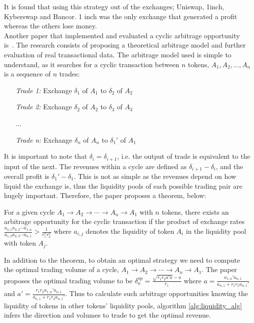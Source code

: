 \noindent It is found that using this strategy out of the exchanges; Uniswap, 1inch, Kyberswap and Bancor. 1 inch was the only exchange that generated a profit whereas the others lose money.
\\[5mm]
Another paper that implemented and evaluated a cyclic arbitrage opportunity is~\cite{wang_cyclic_2022}. The research consists of proposing a theoretical arbitrage model and further evaluation of real transactional data. The arbitrage model used is simple to understand, as it searches for a cyclic transaction between $n$ tokens, $A_1, A_2, ..., A_n$ is a sequence of $n$ trades:
\begin{center}
    \begin{minipage}[c]{0.4\linewidth}
        \begin{itemize}
            \item[\textit{Trade 1:}] Exchange $\delta_1$ of $A_1$ to $\delta_2$ of $A_2$
            \item[\textit{Trade 2:}] Exchange $\delta_2$ of $A_2$ to $\delta_3$ of $A_3$
            \item[] $\dotsc$
            \item[\textit{Trade n:}] Exchange $\delta_n$ of $A_n$ to $\delta_1'$ of $A_1$
        \end{itemize}
    \end{minipage}
\end{center}

\noindent It is important to note that $\delta_i = \delta_{i+1}$, i.e. the output of trade is equivalent to the input of the next. The revenues within a cycle are defined as $\delta_{i+1} - \delta_i$, and the overall profit is $\delta_{1}' - \delta_1$. This is not as simple as the revenues depend on how liquid the exchange is, thus the liquidity pools of each possible trading pair are hugely important. Therefore, the paper proposes a theorem, below:

\begin{theorem}
    For a given cycle $A_1 \rightarrow A_2 \rightarrow \cdots \rightarrow A_n \rightarrow A_1$ with $n$ tokens, there exists an arbitrage opportunity for the cyclic transaction if the product of exchange rates $\frac{a_{2,1}a_{3,2}\cdots a_{1,n}}{a_{1,2}a_{2,3}\cdots a_{n, 1}} > \frac{1}{r_1^n r_2^n}$ where $a_{i,j}$ denotes the liquidity of token $A_i$ in the liquidity pool with token $A_j$.~\cite{wang_cyclic_2022}
\end{theorem}

\noindent In addition to the theorem, to obtain an optimal strategy we need to compute the optimal trading volume of a cycle, $A_1 \rightarrow A_2 \rightarrow \cdots \rightarrow A_n \rightarrow A_1$. The paper proposes the optimal trading volume to be $\delta^{op}_a = \frac{\sqrt{r_1 r_2 a' a} - a}{r_1}$ where $a = \frac{a_{1,n}'a_{n,1}}{a_{n,1}+r_1 r_2 a_{n,1}'}$ and $a' = \frac{r_1 r_2 a_{1,n}'a_{n,1}}{a_{n,1}+r_1 r_2 a_{n,1}'}$. Thus to calculate such arbitrage opportunities knowing the liquidity of tokens in other tokens' liquidity pools, algorithm \ref{alg:liquidity_alg} infers the direction and volumes to trade to get the optimal revenue.

